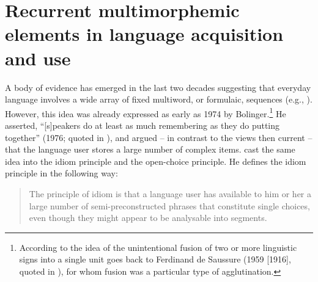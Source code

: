 \section{Recurrent multimorphemic elements in language acquisition and use}

A body of evidence has emerged in the last two decades suggesting that everyday language involves a wide array of fixed multiword, or formulaic, sequences (e.g., \citealt{corrigan-etal-2009,schmitt2004,wray-2002,wray-2008,taylor-mental-2012}). However, this idea was already expressed as early as 1974 by Bolinger.\footnote{According to \citet{tremblay-etal11} the idea of the unintentional fusion of two or more linguistic signs into a single unit goes back to Ferdinand de Saussure (1959 [1916], quoted in \citealt[571]{tremblay-etal11}), for whom fusion was a particular type of agglutination.} He asserted, ``[s]peakers do at least as much remembering as they do putting together'' (1976; quoted in \citealt[29]{erman-warren-2000}), and argued -- in contrast to the views then current -- that the language user stores a large number of complex items. \citet{sinclair-1991} cast the same idea into the idiom principle and the open-choice principle. He defines the idiom principle in the following way:

\begin{quote}
The principle of idiom is that a language user has available to him or her a large number of semi-preconstructed phrases that constitute single choices, even though they might appear to be analysable into segments. \citep[][110]{sinclair-1991}
\end{quote}

